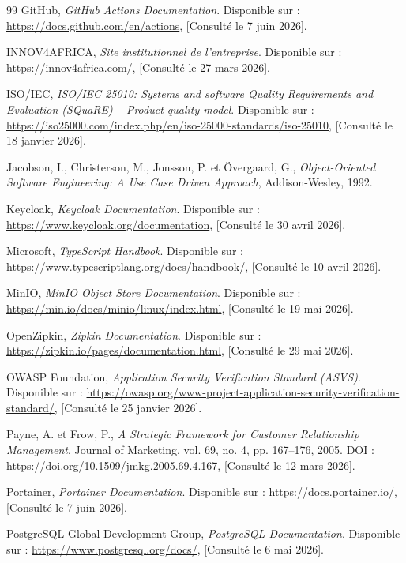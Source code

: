 \begin{thebibliography}{99}
GitHub, \textit{GitHub Actions Documentation}.
Disponible sur : \url{https://docs.github.com/en/actions}, [Consulté le 7 juin 2026].

INNOV4AFRICA, \textit{Site institutionnel de l'entreprise}.
Disponible sur : \url{https://innov4africa.com/}, [Consulté le 27 mars 2026].

ISO/IEC, \textit{ISO/IEC 25010: Systems and software Quality Requirements and Evaluation (SQuaRE) -- Product quality model}.
Disponible sur : \url{https://iso25000.com/index.php/en/iso-25000-standards/iso-25010}, [Consulté le 18 janvier 2026].

Jacobson, I., Christerson, M., Jonsson, P. et Övergaard, G., \textit{Object-Oriented Software Engineering: A Use Case Driven Approach}, Addison-Wesley, 1992.

Keycloak, \textit{Keycloak Documentation}.
Disponible sur : \url{https://www.keycloak.org/documentation}, [Consulté le 30 avril 2026].

Microsoft, \textit{TypeScript Handbook}.
Disponible sur : \url{https://www.typescriptlang.org/docs/handbook/}, [Consulté le 10 avril 2026].

MinIO, \textit{MinIO Object Store Documentation}.
Disponible sur : \url{https://min.io/docs/minio/linux/index.html}, [Consulté le 19 mai 2026].

OpenZipkin, \textit{Zipkin Documentation}.
Disponible sur : \url{https://zipkin.io/pages/documentation.html}, [Consulté le 29 mai 2026].

OWASP Foundation, \textit{Application Security Verification Standard (ASVS)}.
Disponible sur : \url{https://owasp.org/www-project-application-security-verification-standard/}, [Consulté le 25 janvier 2026].

Payne, A. et Frow, P., \textit{A Strategic Framework for Customer Relationship
Management}, Journal of Marketing, vol. 69, no. 4, pp. 167--176, 2005.
DOI : \url{https://doi.org/10.1509/jmkg.2005.69.4.167}, [Consulté le 12 mars 2026].

Portainer, \textit{Portainer Documentation}.
Disponible sur : \url{https://docs.portainer.io/}, [Consulté le 7 juin 2026].

PostgreSQL Global Development Group, \textit{PostgreSQL Documentation}.
Disponible sur : \url{https://www.postgresql.org/docs/}, [Consulté le 6 mai 2026].


\end{thebibliography}
